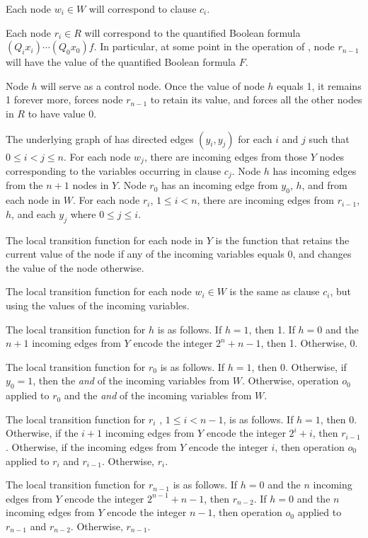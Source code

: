 Each node $w_i \in W$ will correspond to clause $c_i$.

Each node $r_i \in R$ will correspond to the quantified Boolean formula
$(Q_i x_i) \cdots  (Q_0 x_0) f$.
In particular, at some point in the operation of \cals{},
node $r_{n-1}$ will have the value of the quantified Boolean formula $F$.

Node $h$ will serve as a control node.
Once the value of node $h$ equals 1,  it remains 1 forever more,
forces node $r_{n-1}$ to retain its value, and forces all the other nodes in $R$ to have value 0.

The underlying graph of \cals{} has directed edges
$(y_i, y_j)$ for each $i$ and $j$ such that $0 \leq i < j \leq n$.
For each node $w_j$, there are incoming edges from those $Y$ nodes
corresponding to the variables occurring in clause $c_j$.
Node $h$ has incoming edges from the $n+1$ nodes in $Y$.
Node $r_0$ has an incoming edge from $y_0$, $h$, and from each node in $W$.
For each node $r_i$, $1 \leq i < n$,
there are incoming edges from $r_{i-1}$, $h$, and each $y_j$ where $0 \leq j \leq i$.


The local transition function for each node in $Y$ is the function 
that retains the current value of the node if any of the incoming variables equals 0,
and changes the value of the node otherwise.

The local transition function for each node $w_i \in W$ is the same as clause $c_i$,
but using the values of the incoming variables.

The local transition function for $h$ is as follows.
If $h=1$, then 1.
If $h =0$ and  the $n+1$ incoming edges from $Y$ encode the integer $2^n+n-1$, then 1.
Otherwise, $0$.

The local transition function for $r_0$ is as follows.
If $h =1$, then 0.
Otherwise, if $y_0 = 1$, then the {\em and} of the incoming variables from $W$.
Otherwise, operation $o_0$ 
applied to $r_0$ and the {\em and} of the incoming variables from $W$.

The local transition function for $r_i$ , $1 \leq i < n-1$, is as follows.
If $h =1$, then 0.
Otherwise, if the $i+1$ incoming edges from $Y$ encode the integer $2^i+i$, 
then $r_{i-1}$.
Otherwise,  if the incoming edges from $Y$ encode the integer $i$, 
then operation $o_0$ applied to $r_i$ and $r_{i-1}$.
Otherwise, $r_i$.

The local transition function for $r_{n-1}$ is as follows.
If $h=0$ and the $n$ incoming edges from $Y$ encode the integer $2^{n-1}+n-1$, 
then $r_{n-2}$.
If $h =0$ and  the $n$ incoming edges from $Y$ encode the integer $n-1$, 
then operation $o_0$ applied to $r_{n-1}$ and $r_{n-2}$.
Otherwise, $r_{n-1}$.

